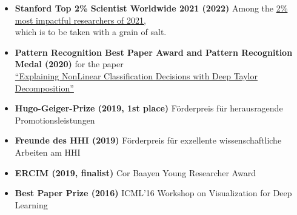 
\begin{itemize}
    \item [] \textbf{Stanford Top 2\% Scientist Worldwide 2021 (2022)}
    Among the \href{https://elsevier.digitalcommonsdata.com/datasets/btchxktzyw/4}{2\% most impactful researchers of 2021,}\\
    {\vphantom{}\qquad which is to be taken with a grain of salt.}

    \item[] \textbf{Pattern Recognition Best Paper Award and Pattern Recognition Medal (2020)}
    for the paper\\
    \href{https://doi.org/10.1016/j.patcog.2016.11.008}{\qquad ``Explaining NonLinear Classification Decisions with Deep Taylor Decomposition''}

    \item[] \textbf{Hugo-Geiger-Prize (2019, 1st place)}
    F\"orderpreis f\"ur herausragende Promotionsleistungen
    
    \item[] \textbf{Freunde des HHI (2019)}
    F\"orderpreis f\"ur exzellente wissenschaftliche Arbeiten am HHI
    
    \item[] \textbf{ERCIM (2019, finalist)}
    Cor Baayen Young Researcher Award

    \item[] \textbf{Best Paper Prize (2016)}
    ICML'16 Workshop on Visualization for Deep Learning
\end{itemize}





